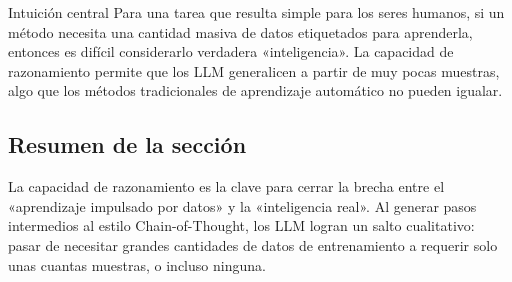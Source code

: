 \begin{importantbox}{Intuición central}
Para una tarea que resulta simple para los seres humanos, si un método necesita una cantidad masiva de datos etiquetados para aprenderla, entonces es difícil considerarlo verdadera «inteligencia». La capacidad de razonamiento permite que los LLM generalicen a partir de muy pocas muestras, algo que los métodos tradicionales de aprendizaje automático no pueden igualar.
\end{importantbox}

\subsection{Resumen de la sección}

La capacidad de razonamiento es la clave para cerrar la brecha entre el «aprendizaje impulsado por datos» y la «inteligencia real». Al generar pasos intermedios al estilo Chain-of-Thought, los LLM logran un salto cualitativo: pasar de necesitar grandes cantidades de datos de entrenamiento a requerir solo unas cuantas muestras, o incluso ninguna.

